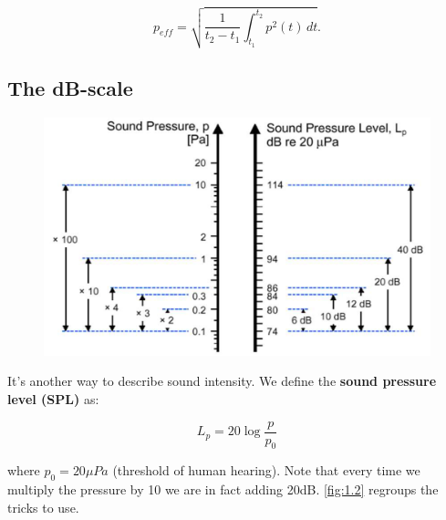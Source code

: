 	\begin{equation}
	p_{eff} = \sqrt{\frac{1}{t_2 - t_1} \int _{t_1}^{t_2}p^2(t) \, dt}.
	\end{equation}
	
\subsection{The dB-scale}
	\begin{figure}
	\vspace{-6mm}
	\includegraphics[scale=0.3]{acoustics/ch1/2}
	\label{fig:1.2}
	\end{figure}	
	It's another way to describe sound intensity. We define the \textbf{sound pressure level (SPL)} as:
	
	\begin{equation}
	L_p = 20 \log \frac{p}{p_0}
	\end{equation}
	
	where $p_0 = 20\mu Pa$ (threshold of human hearing). Note that every time we multiply the pressure by 10 we are in fact adding 20dB. \autoref{fig:1.2} regroups the tricks to use. 
	
